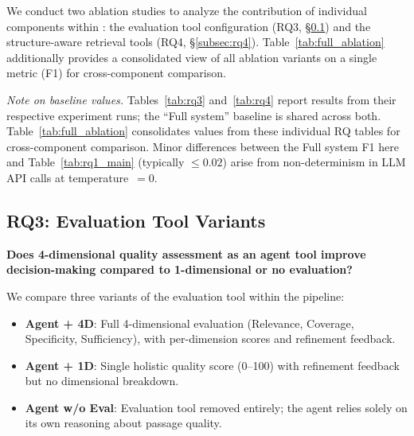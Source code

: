 
We conduct two ablation studies to analyze the contribution of individual components within \ours{}: the evaluation tool configuration (RQ3, \S\ref{subsec:rq3}) and the structure-aware retrieval tools (RQ4, \S\ref{subsec:rq4}).
Table~\ref{tab:full_ablation} additionally provides a consolidated view of all ablation variants on a single metric (F1) for cross-component comparison.

\noindent\textit{Note on baseline values.}
Tables~\ref{tab:rq3} and~\ref{tab:rq4} report results from their respective experiment runs; the ``Full system'' baseline is shared across both.
Table~\ref{tab:full_ablation} consolidates values from these individual RQ tables for cross-component comparison.
Minor differences between the Full system F1 here and Table~\ref{tab:rq1_main} (typically $\leq 0.02$) arise from non-determinism in LLM API calls at temperature~$= 0$.

\subsection{RQ3: Evaluation Tool Variants}
\label{subsec:rq3}

\textbf{Does 4-dimensional quality assessment as an agent tool improve decision-making compared to 1-dimensional or no evaluation?}

We compare three variants of the evaluation tool within the \ours{} pipeline:
\begin{itemize}
    \item \textbf{Agent + 4D}: Full 4-dimensional evaluation (Relevance, Coverage, Specificity, Sufficiency), with per-dimension scores and refinement feedback.
    \item \textbf{Agent + 1D}: Single holistic quality score (0--100) with refinement feedback but no dimensional breakdown.
    \item \textbf{Agent w/o Eval}: Evaluation tool removed entirely; the agent relies solely on its own reasoning about passage quality.
\end{itemize}

